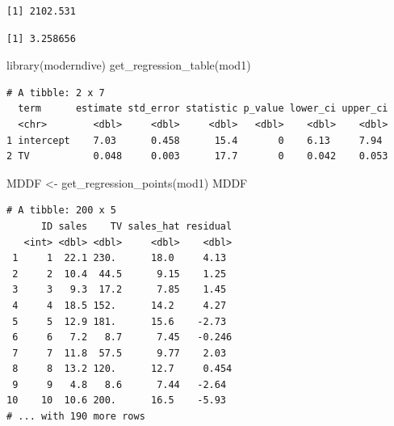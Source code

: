 \documentclass[
]{article}
\newenvironment{Shaded}{\begin{snugshade}}{\end{snugshade}}
\newcommand{\DecValTok}[1]{\textcolor[rgb]{0.00,0.00,0.81}{#1}}
\newcommand{\FunctionTok}[1]{\textcolor[rgb]{0.00,0.00,0.00}{#1}}
\newcommand{\NormalTok}[1]{#1}
\newcommand{\OtherTok}[1]{\textcolor[rgb]{0.56,0.35,0.01}{#1}}
\newcommand{\SpecialCharTok}[1]{\textcolor[rgb]{0.00,0.00,0.00}{#1}}
\begin{document}
\begin{verbatim}
[1] 2102.531
\end{verbatim}

\begin{Shaded}
\end{Shaded}

\begin{verbatim}
[1] 3.258656
\end{verbatim}

\begin{Shaded}
\begin{Highlighting}[]
\FunctionTok{library}\NormalTok{(moderndive)}
\FunctionTok{get\_regression\_table}\NormalTok{(mod1)}
\end{Highlighting}
\end{Shaded}

\begin{verbatim}
# A tibble: 2 x 7
  term      estimate std_error statistic p_value lower_ci upper_ci
  <chr>        <dbl>     <dbl>     <dbl>   <dbl>    <dbl>    <dbl>
1 intercept    7.03      0.458      15.4       0    6.13     7.94 
2 TV           0.048     0.003      17.7       0    0.042    0.053
\end{verbatim}

\begin{Shaded}
\begin{Highlighting}[]
\NormalTok{MDDF }\OtherTok{\textless{}{-}} \FunctionTok{get\_regression\_points}\NormalTok{(mod1)}
\NormalTok{MDDF}
\end{Highlighting}
\end{Shaded}

\begin{verbatim}
# A tibble: 200 x 5
      ID sales    TV sales_hat residual
   <int> <dbl> <dbl>     <dbl>    <dbl>
 1     1  22.1 230.      18.0     4.13 
 2     2  10.4  44.5      9.15    1.25 
 3     3   9.3  17.2      7.85    1.45 
 4     4  18.5 152.      14.2     4.27 
 5     5  12.9 181.      15.6    -2.73 
 6     6   7.2   8.7      7.45   -0.246
 7     7  11.8  57.5      9.77    2.03 
 8     8  13.2 120.      12.7     0.454
 9     9   4.8   8.6      7.44   -2.64 
10    10  10.6 200.      16.5    -5.93 
# ... with 190 more rows
\end{verbatim}
\end{document}
